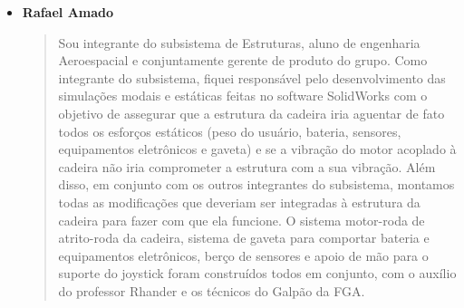 \begin{itemize}
    \item \textbf{Rafael Amado}
    \begin{quote}
      Sou integrante do subsistema de Estruturas, aluno de engenharia Aeroespacial e conjuntamente gerente de produto do grupo. Como integrante do subsistema, fiquei responsável pelo desenvolvimento das simulações modais e estáticas feitas no software SolidWorks com o objetivo de assegurar que a estrutura da cadeira iria aguentar de fato todos os esforços estáticos (peso do usuário, bateria, sensores, equipamentos eletrônicos e gaveta) e se a vibração do motor acoplado à cadeira não iria comprometer a estrutura com a sua vibração. Além disso, em conjunto com os outros integrantes do subsistema, montamos todas as modificações que deveriam ser integradas à estrutura da cadeira para fazer com que ela funcione. O sistema motor-roda de atrito-roda da cadeira, sistema de gaveta para comportar bateria e equipamentos eletrônicos, berço de sensores e apoio de mão para o suporte do joystick foram construídos todos em conjunto, com o auxílio do professor Rhander e os técnicos do Galpão da FGA.
    \end{quote}
\end{itemize}
